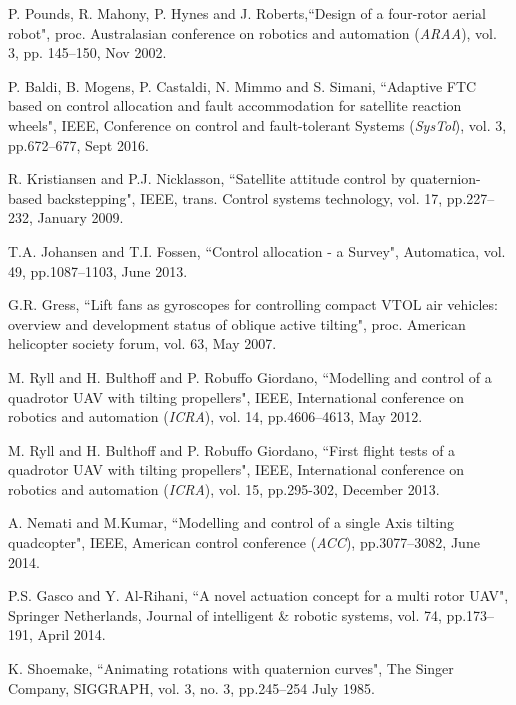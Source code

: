 \documentclass[a4paper, 10pt, conference]{ieeeconf}
\begin{document}
\begin{thebibliography}{00}
 P. Pounds, R. Mahony, P. Hynes and J. Roberts,``Design of a four-rotor aerial robot", proc. Australasian conference on robotics and automation (\emph{ARAA}), vol. 3, pp. 145--150, Nov 2002.

 P. Baldi, B. Mogens, P. Castaldi, N. Mimmo and S. Simani, ``Adaptive FTC based on control allocation and fault accommodation for satellite reaction wheels", IEEE, Conference on control and fault-tolerant Systems (\emph{SysTol}), vol. 3, pp.672--677, Sept 2016. 

 R. Kristiansen and P.J. Nicklasson, ``Satellite attitude control by quaternion-based backstepping", IEEE, trans. Control systems technology, vol. 17, pp.227--232, January 2009.

 T.A. Johansen and T.I. Fossen, ``Control allocation - a Survey", Automatica, vol. 49, pp.1087--1103, June 2013.

 G.R. Gress, ``Lift fans as gyroscopes for controlling compact VTOL air vehicles: overview and development status of oblique active tilting", proc. American helicopter society forum, vol. 63, May 2007.

 M. Ryll and H. Bulthoff and P. Robuffo Giordano, ``Modelling and control of a quadrotor UAV with tilting propellers", IEEE, International conference on robotics and automation (\emph{ICRA}), vol. 14, pp.4606--4613, May 2012.

 M. Ryll and H. Bulthoff and P. Robuffo Giordano, ``First flight tests of a quadrotor UAV with tilting propellers", IEEE, International conference on robotics and automation (\emph{ICRA}), vol. 15, pp.295-302, December 2013.

 A. Nemati and M.Kumar, ``Modelling and control of a single Axis tilting quadcopter", IEEE, American control conference (\emph{ACC}), pp.3077--3082, June 2014.

 P.S. Gasco and Y. Al-Rihani, ``A novel actuation concept for a multi rotor UAV", Springer Netherlands, Journal of intelligent \& robotic systems, vol. 74, pp.173--191, April 2014.

 K. Shoemake, ``Animating rotations with quaternion curves", The Singer Company, SIGGRAPH, vol. 3, no. 3, pp.245--254 July 1985.


\end{thebibliography}
\end{document}

